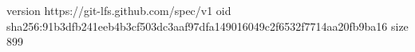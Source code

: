 version https://git-lfs.github.com/spec/v1
oid sha256:91b3dfb241eeb4b3cf503dc3aaf97dfa149016049c2f6532f7714aa20fb9ba16
size 899
